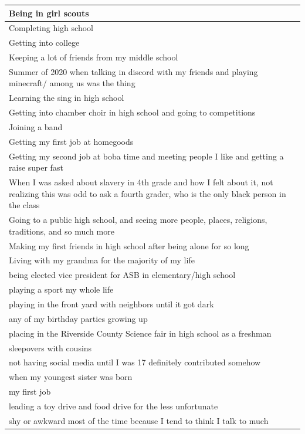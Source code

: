 \documentclass[
  .7em,
  letterpaper,
  DIV=11,
  numbers=noendperiod]{scrartcl}
\begin{document}
\begin{table}
\begin{tabular}{l}
Being in girl scouts\\
\hline
Completing high school\\
\hline
Getting into college\\
\hline
Keeping a lot of friends from my middle school\\
\hline
Summer of 2020 when talking in discord with my friends and playing minecraft/ among us was the thing\\
\hline
Learning the sing in high school\\
\hline
Getting into chamber choir in high school and going to competitions\\
\hline
Joining a band\\
\hline
Getting my first job at homegoods\\
\hline
Getting my second job at boba time and meeting people I like and getting a raise super fast\\
\hline
When I was asked about slavery in 4th grade and how I felt about it, not realizing this was odd to ask a fourth grader, who is the only black person in the class\\
\hline
Going to a public high school, and seeing more people, places, religions, traditions, and so much more\\
\hline
Making my first friends in high school after being alone for so long\\
\hline
Living with my grandma for the majority of my life\\
\hline
being elected vice president for ASB in elementary/high school\\
\hline
playing a sport my whole life\\
\hline
playing in the front yard with neighbors until it got dark\\
\hline
any of my birthday parties growing up\\
\hline
placing in the Riverside County Science fair in high school as a freshman\\
\hline
sleepovers with cousins\\
\hline
not having social media until I was 17 definitely contributed somehow\\
\hline
when my youngest sister was born\\
\hline
my first job\\
\hline
leading a toy drive and food drive for the less unfortunate\\
\hline
shy or awkward most of the time because I tend to think I talk to much\\
\hline

\end{tabular}
\end{table}
\end{document}
